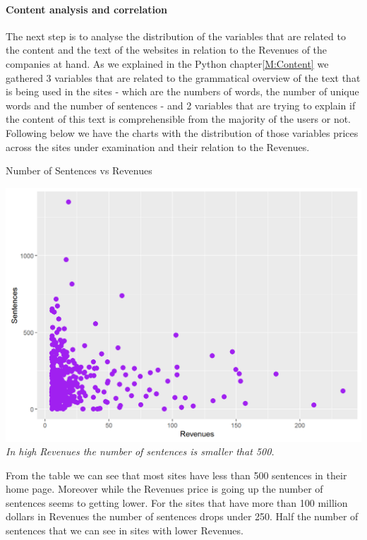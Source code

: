 \documentclass{article}
\begin{document}
\paragraph{Content analysis and correlation}
The next step is to analyse the distribution of the variables that are related to the content and the text of the websites in relation to the Revenues of the companies at hand. As we explained in the Python chapter\ref{M:Content} we gathered 3 variables that are related to the grammatical overview of the text that is being used in the sites - which are the numbers of words, the number of unique words and the number of sentences - and 2 variables that are trying to explain if the content of this text is comprehensible from the majority of the users or not. Following below we have the charts with the distribution of those variables prices across the sites under examination and their relation to the Revenues.
\begin{table}[H]
\centering
\caption{Number of Sentences vs Revenues}
\begin{center}
\includegraphics[scale=0.4]{../R/photos/33_sent_rev.png}  \\
\textit{In high Revenues the number of sentences is smaller that 500.}
\end{center}
\end{table}
From the table we can see that most sites have less than 500 sentences in their home page. Moreover while the Revenues price is going up the number of sentences seems to getting lower. For the sites that have more than 100 million dollars in Revenues the number of sentences drops under 250. Half the number of sentences that we can see in sites with lower Revenues.
\end{document}
